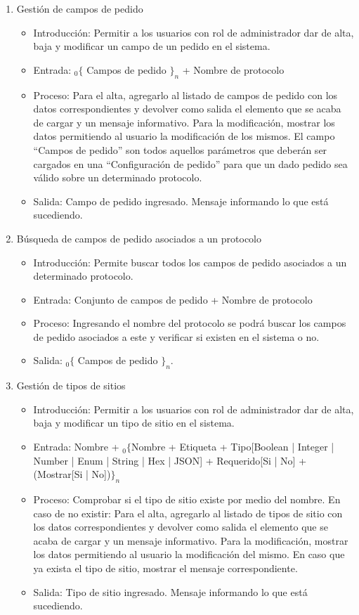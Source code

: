 \begin{enumerate}
			\item Gestión de campos de pedido
				\begin{itemize}
					\item Introducción: Permitir a los usuarios con rol de administrador dar de alta, baja y modificar un campo de un pedido en el sistema.
					\item Entrada: ${}_{0}\{$ Campos de pedido $\}_n$ + Nombre de protocolo
					\item Proceso: Para el alta, agregarlo al listado de campos de pedido con los datos correspondientes y devolver como salida el elemento que se acaba de cargar y un mensaje informativo.
					Para la modificación, mostrar los datos permitiendo al usuario la modificación de los mismos.
					El campo ``Campos de pedido'' son todos aquellos parámetros que deberán ser cargados en una ``Configuración de pedido'' para que un dado pedido sea válido sobre un determinado protocolo.
					\item Salida: Campo de pedido ingresado. Mensaje informando lo que está sucediendo.
				\end{itemize}

			\item Búsqueda de campos de pedido asociados a un protocolo
				\begin{itemize}
					\item Introducción: Permite buscar todos los campos de pedido asociados a un determinado protocolo.
					\item Entrada: Conjunto de campos de pedido + Nombre de protocolo
					\item Proceso: Ingresando el nombre del protocolo se podrá buscar los campos de pedido asociados a este y verificar si existen en el sistema o no.
					\item Salida: ${}_{0}\{$ Campos de pedido $\}_n$.
				\end{itemize}
				
			\item Gestión de tipos de sitios
				\begin{itemize}
					\item Introducción: Permitir a los usuarios con rol de administrador dar de alta, baja y modificar un tipo de sitio en el sistema.
					\item Entrada: Nombre + ${}_{0}\{$Nombre + Etiqueta + Tipo[Boolean | Integer | Number | Enum | String | Hex | JSON] + Requerido[Si | No] + (Mostrar[Si | No])$\}_n$
					\item Proceso: Comprobar si el tipo de sitio existe por medio del nombre. En caso de no existir: 
					Para el alta, agregarlo al listado de tipos de sitio con los datos correspondientes y devolver como salida el elemento que se acaba de cargar y un mensaje informativo.
					Para la modificación, mostrar los datos permitiendo al usuario la modificación del mismo.
					En caso que ya exista el tipo de sitio, mostrar el mensaje correspondiente.
					\item Salida: Tipo de sitio ingresado. Mensaje informando lo que está sucediendo.
				\end{itemize}


\end{enumerate}
